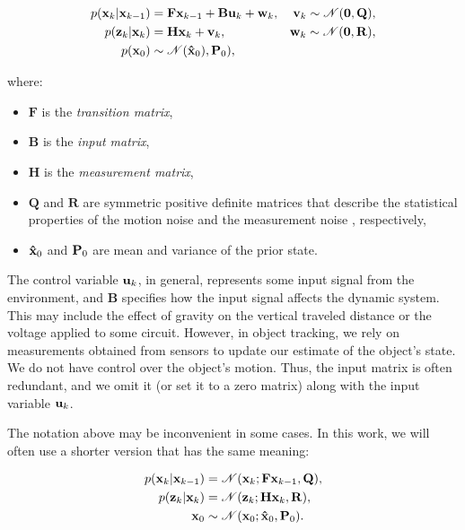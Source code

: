 \begin{align}
    p(\vecat{x}{k} | \vecat{x}{k-1}) 
        &= \mathbf{F} \vecat{x}{k-1}
            + \mathbf{B} \vecat{u}{k}
            + \vecat{w}{k},
        & \vecat{v}{k} \sim \mathscr{N}(\mathbf{0}, \mathbf{Q}), \\
    p(\vecat{z}{k} | \vecat{x}{k})
        &= \mathbf{H} \vecat{x}{k} + \vecat{v}{k},
        & \vecat{w}{k} \sim \mathscr{N}(\mathbf{0}, \mathbf{R}), \\
    p(\vecat{x}{0}) &\sim \mathscr{N}(\vecat{\hat{x}}{0}), \vecat{P}{0}),&
\end{align}

where:

\begin{itemize}
    \item $\mathbf{F}$ is the \textit{transition matrix},
    \item $\mathbf{B}$ is the \textit{input matrix},
    \item $\mathbf{H}$ is the \textit{measurement matrix},
    \item $\mathbf{Q}$ and $\mathbf{R}$ are symmetric positive definite matrices
        that describe the statistical properties of the motion noise
         and the measurement noise , respectively,
    \item $\vecat{\hat x}{0}$ and $\vecat{P}{0}$ are mean and variance of the 
    prior state.
\end{itemize}

The control variable $\vecat{u}{k}$, in general, represents some input signal from the environment, and $\mathbf{B}$ specifies how the input signal affects the dynamic system. This may include the effect of gravity on the vertical traveled distance or the voltage applied to some circuit. However, in object tracking, we rely on measurements obtained from sensors to update our estimate of the object's state. We do not have control over the object's motion. Thus, the input matrix is often redundant, and we omit it (or set it to a zero matrix) along with the input variable $\vecat{u}{k}$.

The notation above may be inconvenient in some cases. In this work, we will often use a shorter version that has the same meaning:

\begin{align}
    p(\vecat{x}{k} | \vecat{x}{k-1})
        &= \mathscr{N}(\vecat{x}{k}; \mathbf{F}\vecat{x}{k-1}, \mathbf{Q}), 
        \label{eq:motion-model} \\
    p(\vecat{z}{k} | \vecat{x}{k})
        &= \mathscr{N}(\vecat{z}{k}; \mathbf{H}\vecat{x}{k}, \mathbf{R}), 
        \label{eq:measurement-model} \\
    \vecat{x}{0}
        &\sim \mathscr{N}(\vecat{x}{0}; \vecat{\hat{x}}{0}, \vecat{P}{0}).
        \label{eq:prior-x0}
\end{align}

